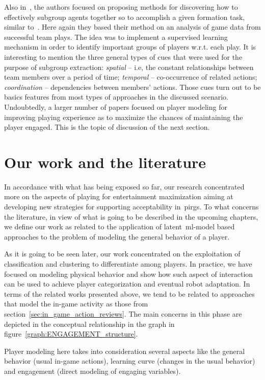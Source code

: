 Also in~\cite{laviersa_using_2014}, the authors focused on proposing methods for discovering how to effectively  subgroup agents together so to accomplish a given formation task, similar to~\cite{stone_task_1999}. Here again they based their method on an analysis of game data from successful team plays. The idea was to implement a supervised learning mechanism in order to identify important groups of players w.r.t. each play. It is interesting to mention the three general types of cues that were used for the purpose of subgroup extraction: \textit{spatial} -- i.e, the constant relationships between team members over a period of time; \textit{temporal} -- co-occurrence of related actions; \textit{coordination} -- dependencies between members' actions. Those cues turn out to be basics features from most types of approaches in the discussed scenario. Undoubtedly, a larger number of papers focused on player modeling for improving playing experience as to maximize the chances of maintaining the player engaged. This is the topic of discussion of the next section.

\section{Our work and the literature}
In accordance with what has being exposed so far, our research concentrated more on the aspects of playing for entertainment maximization aiming at developing new strategies for supporting acceptability in~\gls{pirg}s. To what concerns the literature, in view of what is going to be described in the upcoming chapters, we define our work as related to the application of latent~\gls{ml}-model based approaches to the problem of modeling the general behavior of a player. 

As it is going to be seen later, our work concentrated on the exploitation of classification and clustering to differentiate among players. In practice, we have focused on modeling physical behavior and show how such aspect of interaction can be used to achieve player categorization and eventual robot adaptation. In terms of the related works presented above, we tend to be related to approaches that model the in-game activity as those from section~\ref{sec:in_game_action_reviews}. The main concerns in this phase are depicted in the conceptual relationship in the graph in figure~\ref{graph:ENGAGEMENT_structure}.



Player modeling here takes into consideration several aspects like the general behavior (usual in-game actions), learning curve (changes in the usual behavior) and engagement (direct modeling of engaging variables). 

